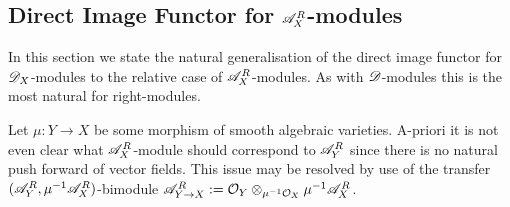 \subsection{Direct Image Functor for $\mathscr{A}_X^R$-modules}
    In this section we state the natural generalisation of the direct image functor for $\mathscr{D}_X$-modules to the relative case of $\mathscr{A}_X^R$-modules. As with $\mathscr{D}$-modules this is the most natural for right-modules.  
    
    Let $\mu:Y\to X$ be some morphism of smooth algebraic varieties.  A-priori it is not even clear what $\mathscr{A}_X^R$-module should correspond to $\mathscr{A}_Y^R$ since there is no natural push forward of vector fields. This issue may be resolved by use of the transfer $(\mathscr{A}_Y^R,\mu^{-1}\mathscr{A}_X^R)$-bimodule $\mathscr{A}_{Y\to X}^R:= \mathcal{O}_Y \otimes_{\mu^{-1}\mathcal{O}_X}\mu^{-1}\mathscr{A}_X^R$. 
    
